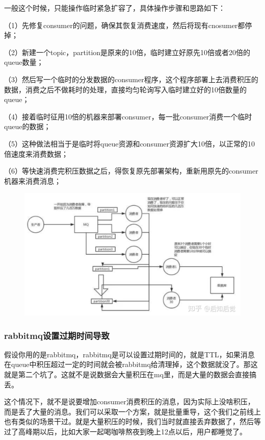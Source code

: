 \documentclass[12pt]{article}
\begin{document}
一般这个时候，只能操作临时紧急扩容了，具体操作步骤和思路如下：

（1）先修复consumer的问题，确保其恢复消费速度，然后将现有cnosumer都停掉；

（2）新建一个topic，partition是原来的10倍，临时建立好原先10倍或者20倍的queue数量；

（3）然后写一个临时的分发数据的consumer程序，这个程序部署上去消费积压的数据，消费之后不做耗时的处理，直接均匀轮询写入临时建立好的10倍数量的queue；

（4）接着临时征用10倍的机器来部署consumer，每一批consumer消费一个临时queue的数据；

（5）这种做法相当于是临时将queue资源和consumer资源扩大10倍，以正常的10倍速度来消费数据；

（6）等快速消费完积压数据之后，得恢复原先部署架构，重新用原先的consumer机器来消费消息；
\begin{figure}[H]
    \centering
    \includegraphics[width=1\textwidth]{fig/Message_Queue_1.png}
\end{figure}

\subsubsection{rabbitmq设置过期时间导致}
假设你用的是rabbitmq，rabbitmq是可以设置过期时间的，就是TTL，如果消息在queue中积压超过一定的时间就会被rabbitmq给清理掉，这个数据就没了。那这就是第二个坑了。这就不是说数据会大量积压在mq里，而是大量的数据会直接搞丢。

这个情况下，就不是说要增加consumer消费积压的消息，因为实际上没啥积压，而是丢了大量的消息。我们可以采取一个方案，就是批量重导，这个我们之前线上也有类似的场景干过。就是大量积压的时候，我们当时就直接丢弃数据了，然后等过了高峰期以后，比如大家一起喝咖啡熬夜到晚上12点以后，用户都睡觉了。
\end{document}
